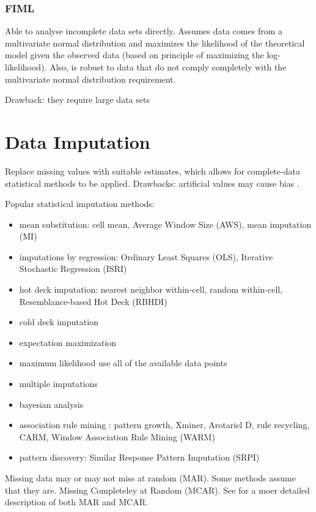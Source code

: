 \documentclass{article}
\begin{document}
\subsubsection{FIML}
Able to analyse incomplete data sets directly. Assumes data comes from a multivariate normal distribution and maximizes the likelihood of the theoretical model given the observed data (based on principle of maximizing the log-likelihood). Also, is robust to data that do not comply completely with the multivariate normal distribution requirement. 

Drawback: they require large data sets


\section{Data Imputation}
Replace missing values with suitable estimates, which allows for complete-data statistical methods to be applied. 
Drawbacks: artificial values may cause bias \cite{myrt}. 

Popular statistical imputation methods:
\begin{itemize}
	\item mean substitution: cell mean\cite{poni}, Average Window Size (AWS)\cite{jiang07}, mean imputation (MI)\cite{myrt}
	\item imputations by regression: Ordinary Least Squares (OLS)\cite{myrt}, Iterative Stochastic Regression (ISRI)
	\item hot deck imputation: nearest neighbor within-cell\cite{poni}, random within-cell\cite{poni}, Resemblance-based Hot Deck (RBHDI)
	\item cold deck imputation
	\item expectation maximization
	\item maximum likelihood
	use all of the available data points
	\item multiple imputations
	\item bayesian analysis
	\item association rule mining : pattern growth\cite{wu}, Xminer\cite{wu}, Arotariel D\cite{wu}, rule recycling\cite{wu}, CARM\cite{jiang07}, Window Association Rule Mining (WARM)\cite{jiang07}
	\item pattern discovery: Similar Response Pattern Imputation (SRPI) \cite{myrt}
\end{itemize}


Missing data may or may not miss at random (MAR). Some methods assume that they are. Missing Completeley at Random (MCAR). See \cite{myrt} for a moer detailed description of both MAR and MCAR. 
\end{document}
